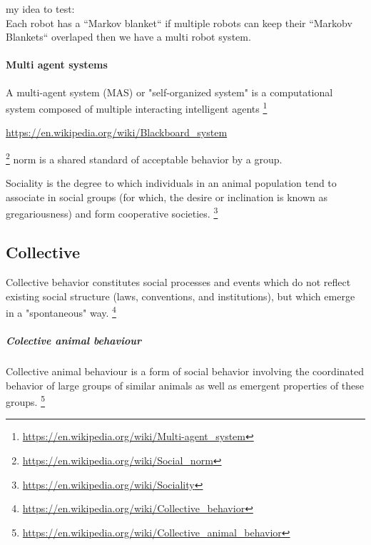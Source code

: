 \documentclass{book}
\providecommand{\seeherefooter}[1]{\footnote{\url{#1}}}
\providecommand{\clickurlfooter}[1]{\footnote{\url{#1}}}
\begin{document}
    my idea to test:\\
    Each robot has a ``Markov blanket`` if multiple robots can keep their ``Markobv Blankets`` overlaped then we have a multi robot system.




    \paragraph{Multi agent systems}
        A multi-agent system (MAS) or "self-organized system" is a computational system composed of multiple interacting intelligent agents
        \seeherefooter{https://en.wikipedia.org/wiki/Multi-agent_system}


\url{https://en.wikipedia.org/wiki/Blackboard_system}


\clickurlfooter{https://en.wikipedia.org/wiki/Social_norm} norm is a shared standard of acceptable behavior by a group.


Sociality is the degree to which individuals in an animal population tend to associate in social groups (for which, the desire or inclination is known as gregariousness) and form cooperative societies. \seeherefooter{https://en.wikipedia.org/wiki/Sociality}

\subsection{Collective}


Collective behavior constitutes social processes and events which do not reflect existing social structure (laws, conventions, and institutions), but which emerge in a "spontaneous" way. \seeherefooter{https://en.wikipedia.org/wiki/Collective_behavior}
    
    
    \subparagraph{Colective animal behaviour}
        Collective animal behaviour is a form of social behavior involving the coordinated behavior of large groups of similar animals as well as emergent properties of these groups.
        \seeherefooter{https://en.wikipedia.org/wiki/Collective_animal_behavior}
\end{document}
